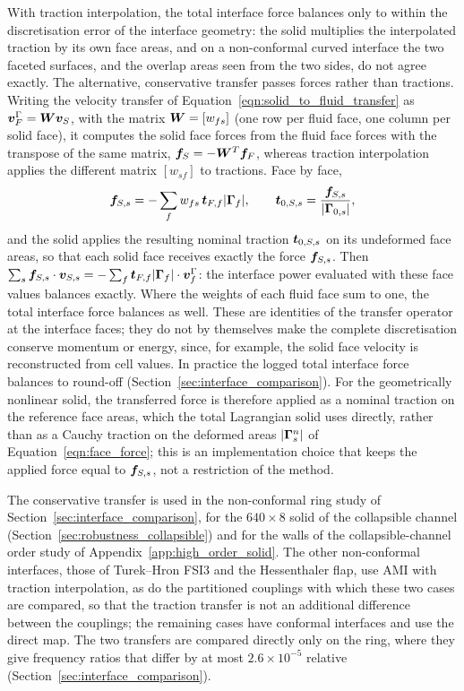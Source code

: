With traction interpolation, the total interface force balances only to within the discretisation error of the interface geometry: the solid multiplies the interpolated traction by its own face areas, and on a non-conformal curved interface the two faceted surfaces, and the overlap areas seen from the two sides, do not agree exactly.
The alternative, conservative transfer passes forces rather than tractions.
Writing the velocity transfer of Equation~\eqref{eqn:solid_to_fluid_transfer} as $\boldsymbol{v}^{\Gamma}_F = \boldsymbol{W}\boldsymbol{v}_S$, with the matrix $\boldsymbol{W} = [w_{fs}]$ (one row per fluid face, one column per solid face), it computes the solid face forces from the fluid face forces with the transpose of the same matrix, $\boldsymbol{f}_S = -\boldsymbol{W}^T\boldsymbol{f}_F$, whereas traction interpolation applies the different matrix $[w_{sf}]$ to tractions.
Face by face,
\begin{equation}
    \boldsymbol{f}_{S,s}
    =
    -\sum_{f} w_{fs}\, \boldsymbol{t}_{F,f} |\boldsymbol{\Gamma}_f|,
    \qquad
    \boldsymbol{t}_{0,S,s} = \frac{\boldsymbol{f}_{S,s}}{|\boldsymbol{\Gamma}_{0,s}|},
    \label{eqn:conservative_transfer}
\end{equation}
and the solid applies the resulting nominal traction $\boldsymbol{t}_{0,S,s}$ on its undeformed face areas, so that each solid face receives exactly the force $\boldsymbol{f}_{S,s}$.
Then $\sum_s \boldsymbol{f}_{S,s}\cdot\boldsymbol{v}_{S,s} = -\sum_f \boldsymbol{t}_{F,f}|\boldsymbol{\Gamma}_f| \cdot \boldsymbol{v}^{\Gamma}_f$: the interface power evaluated with these face values balances exactly.
Where the weights of each fluid face sum to one, the total interface force balances as well.
These are identities of the transfer operator at the interface faces; they do not by themselves make the complete discretisation conserve momentum or energy, since, for example, the solid face velocity is reconstructed from cell values.
In practice the logged total interface force balances to round-off (Section~\ref{sec:interface_comparison}).
For the geometrically nonlinear solid, the transferred force is therefore applied as a nominal traction on the reference face areas, which the total Lagrangian solid uses directly, rather than as a Cauchy traction on the deformed areas $|\boldsymbol{\Gamma}^n_s|$ of Equation~\eqref{eqn:face_force}; this is an implementation choice that keeps the applied force equal to $\boldsymbol{f}_{S,s}$, not a restriction of the method.

The conservative transfer is used in the non-conformal ring study of Section~\ref{sec:interface_comparison}, for the $640\times8$ solid of the collapsible channel (Section~\ref{sec:robustness_collapsible}) and for the walls of the collapsible-channel order study of Appendix~\ref{app:high_order_solid}.
The other non-conformal interfaces, those of Turek--Hron FSI3 and the Hessenthaler flap, use AMI with traction interpolation, as do the partitioned couplings with which these two cases are compared, so that the traction transfer is not an additional difference between the couplings; the remaining cases have conformal interfaces and use the direct map.
The two transfers are compared directly only on the ring, where they give frequency ratios that differ by at most $2.6\times10^{-5}$ relative (Section~\ref{sec:interface_comparison}).

